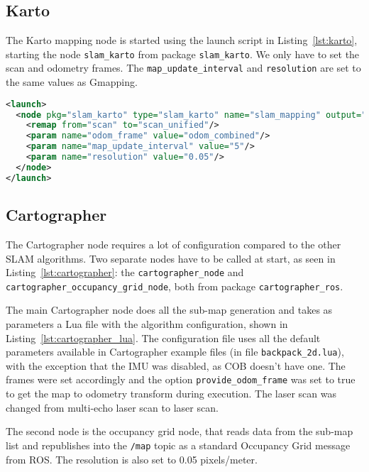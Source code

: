 \subsection{Karto}

The Karto mapping node is started using the launch script in Listing~\ref{lst:karto}, starting the node \texttt{slam\_karto} from package \texttt{slam\_karto}. We only have to set the scan and odometry frames. The \texttt{map\_update\_interval} and \texttt{resolution} are set to the same values as Gmapping.

\begin{lstlisting}[caption={Karto launch file.},label={lst:karto},language=XML]
<launch>
  <node pkg="slam_karto" type="slam_karto" name="slam_mapping" output="screen">
    <remap from="scan" to="scan_unified"/>
    <param name="odom_frame" value="odom_combined"/>
    <param name="map_update_interval" value="5"/>
    <param name="resolution" value="0.05"/>
  </node>
</launch>
\end{lstlisting}

\subsection{Cartographer}

The Cartographer node requires a lot of configuration compared to the other SLAM algorithms. Two separate nodes have to be called at start, as seen in Listing~\ref{lst:cartographer}: the \texttt{cartographer\_node} and \texttt{cartographer\_occupancy\_grid\_node}, both from package \texttt{cartographer\_ros}.

The main Cartographer node does all the sub-map generation and takes as parameters a Lua file with the algorithm configuration, shown in Listing~\ref{lst:cartographer_lua}. The configuration file uses all the default parameters available in Cartographer example files (in file \texttt{backpack\_2d.lua}), with the exception that the IMU was disabled, as COB doesn't have one. The frames were set accordingly and the option \texttt{provide\_odom\_frame} was set to true to get the map to odometry transform during execution. The laser scan was changed from multi-echo laser scan to laser scan.

The second node is the occupancy grid node, that reads data from the sub-map list and republishes into the \texttt{/map} topic as a standard Occupancy Grid message from ROS. The resolution is also set to 0.05 pixels/meter.


